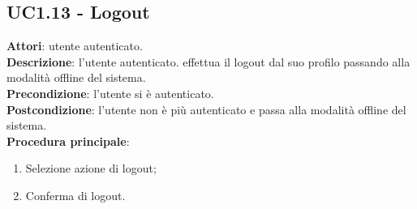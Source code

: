 \subsection{UC1.13 - Logout}{
	\label{uc1.13}
	\textbf{Attori}: utente autenticato.\\
	\textbf{Descrizione}: l'utente autenticato. effettua il logout dal suo profilo passando alla modalità offline del sistema.\\
	\textbf{Precondizione}: l'utente si è autenticato.\\
	\textbf{Postcondizione}: l'utente non è più autenticato e passa alla modalità offline del sistema.\\
	\textbf{Procedura principale}:
	\begin{enumerate}
		\item Selezione azione di logout;
		\item Conferma di logout.
	\end{enumerate}
}